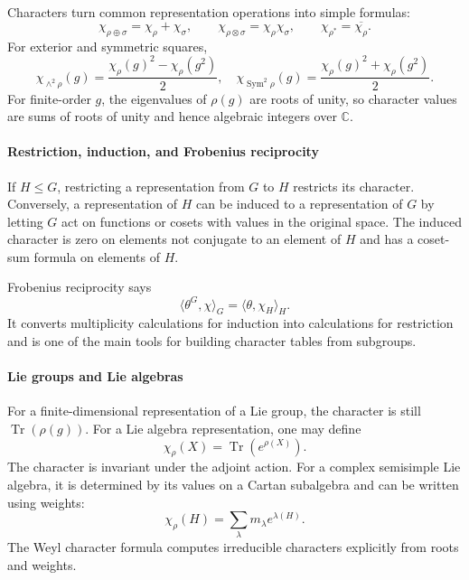 Characters turn common representation operations into simple formulas:
\[
 \chi_{\rho\oplus\sigma}=\chi_\rho+\chi_\sigma,\qquad
 \chi_{\rho\otimes\sigma}=\chi_\rho\chi_\sigma,\qquad
 \chi_{\rho^*}=\overline{\chi_\rho}.
\]
For exterior and symmetric squares,
\[
 \chi_{\wedge^2\rho}(g)=\frac{\chi_\rho(g)^2-\chi_\rho(g^2)}2,
\quad
 \chi_{\operatorname{Sym}^2\rho}(g)=\frac{\chi_\rho(g)^2+\chi_\rho(g^2)}2.
\]
For finite-order $g$, the eigenvalues of $\rho(g)$ are roots of unity, so character values are sums of roots of unity and hence algebraic integers over $\mathbb C$.

\paragraph{Restriction, induction, and Frobenius reciprocity}

If $H\leq G$, restricting a representation from $G$ to $H$ restricts its character. Conversely, a representation of $H$ can be induced to a representation of $G$ by letting $G$ act on functions or cosets with values in the original space. The induced character is zero on elements not conjugate to an element of $H$ and has a coset-sum formula on elements of $H$.

Frobenius reciprocity says
\[
 \langle\theta^G,\chi\rangle_G
 =\langle\theta,\chi_H\rangle_H.
\]
It converts multiplicity calculations for induction into calculations for restriction and is one of the main tools for building character tables from subgroups.

\paragraph{Lie groups and Lie algebras}

For a finite-dimensional representation of a Lie group, the character is still $\operatorname{Tr}(\rho(g))$. For a Lie algebra representation, one may define
\[
 \chi_\rho(X)=\operatorname{Tr}(e^{\rho(X)}).
\]
The character is invariant under the adjoint action. For a complex semisimple Lie algebra, it is determined by its values on a Cartan subalgebra and can be written using weights:
\[
 \chi_\rho(H)=\sum_\lambda m_\lambda e^{\lambda(H)}.
\]
The Weyl character formula computes irreducible characters explicitly from roots and weights.

